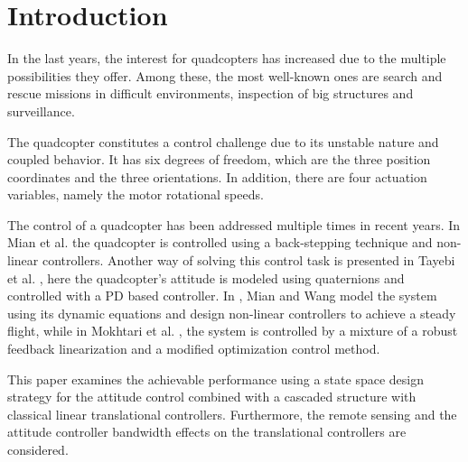 \section{Introduction}
In the last years, the interest for quadcopters has increased due to the multiple possibilities they offer. Among these, the most well-known ones are search and rescue missions in difficult environments, inspection of big structures and surveillance. \nolinebreak\cite{droneuses}

The quadcopter constitutes a control challenge due to its unstable nature and coupled behavior. It has six degrees of freedom, which are the three position coordinates and the three orientations. In addition, there are four actuation variables, namely the motor rotational speeds. \cite{draganflyer}

The control of a quadcopter has been addressed multiple times in recent years. In Mian et al. \cite{backstepping} the quadcopter is controlled using a back-stepping technique and non-linear controllers. Another way of solving this control task is presented in Tayebi et al. \cite{quaternionsPD}, here the quadcopter's attitude is modeled using quaternions and controlled with a PD based controller. In \cite{MianWang}, Mian and Wang model the system using its dynamic equations and design non-linear controllers to achieve a steady flight, while in Mokhtari et al. \cite{GHinf}, the system is controlled by a mixture of a robust feedback linearization and a modified optimization control method.

This paper examines the achievable performance using a state space design strategy for the attitude control combined with a cascaded structure with classical linear translational controllers. Furthermore, the remote sensing and the attitude controller bandwidth effects on the translational controllers are considered.
%

